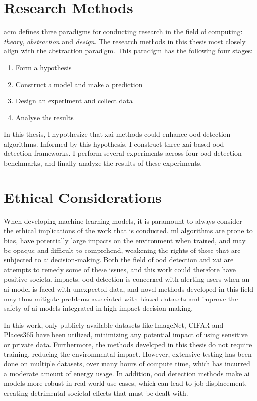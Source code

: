 \documentclass[UKenglish]{uiomasterthesis} %
\theoremstyle{definition}
\begin{document}
\section{Research Methods}

\ac{acm} \cite{acm} defines three paradigms for conducting research in the field of computing: {\it theory}, {\it abstraction} and {\it design}. The research methods in this thesis most closely align with the abstraction paradigm. This paradigm has the following four stages:

\begin{enumerate}
    \item Form a hypothesis
    \item Construct a model and make a prediction
    \item Design an experiment and collect data
    \item Analyse the results
\end{enumerate}

In this thesis, I hypothesize that \ac{xai} methods could enhance \ac{ood} detection algorithms. Informed by this hypothesis, I construct three \ac{xai} based \ac{ood} detection frameworks. I perform several experiments across four \ac{ood} detection benchmarks, and finally analyze the results of these experiments.

\section{Ethical Considerations}

When developing machine learning models, it is paramount to always consider the ethical implications of the work that is conducted. \ac{ml} algorithms are prone to bias, have potentially large impacts on the environment when trained, and may be opaque and difficult to comprehend, weakening the rights of those that are subjected to \ac{ai} decision-making. Both the field of \ac{ood} detection and \ac{xai} are attempts to remedy some of these issues, and this work could therefore have positive societal impacts. \ac{ood} detection is concerned with alerting users when an \ac{ai} model is faced with unexpected data, and novel methods developed in this field may thus mitigate problems associated with biased datasets and improve the safety of \ac{ai} models integrated in high-impact decision-making. 

In this work, only publicly available datasets like ImageNet, CIFAR and Places365 have been utilized, minimizing any potential impact of using sensitive or private data. Furthermore, the methods developed in this thesis do not require training, reducing the environmental impact. However, extensive testing has been done on multiple datasets, over many hours of compute time, which has incurred a moderate amount of energy usage. In addition, \ac{ood} detection methods make \ac{ai} models more robust in real-world use cases, which can lead to job displacement, creating detrimental societal effects that must be dealt with.
\end{document}
